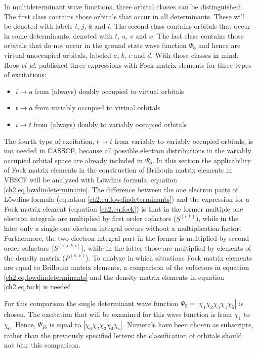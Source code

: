 In multideterminant wave functions, three orbital classes can be distinguished. The first class contains those orbitals that occur in all determinants. These will be denoted with labels $i$, $j$, $k$ and $l$. The second class contains orbitals that occur in some determinants, denoted with $t$, $u$, $v$ and $x$. The last class contains those orbitals that do not occur in the ground state wave function $\Psi_0$ and hence are virtual unoccupied orbitals, labeled $a$, $b$, $c$ and $d$. With those classes in mind, Roos \textit{et al.} published three expressions with Fock matrix elements for three types of excitations:
\begin{itemize}
\item{$i \rightarrow a$ from (always) doubly occupied to virtual orbitals}
\item{$t \rightarrow a$ from variably occupied to virtual orbitals}
\item{$i \rightarrow t$ from (always) doubly to variably occupied orbitals}
\end{itemize}
The fourth type of excitation, $t \rightarrow t$ from variably to variably occupied orbitals, is not needed in CASSCF, because all possible electron distributions in the variably occupied orbital space are already included in $\Psi_0$. In this section the applicability of Fock matrix elements in the construction of Brillouin matrix elements in VBSCF will be analyzed with L\"{o}wdins formula, equation \ref{ch2.eq.lowdindeterminants}. The difference between the one electron parts of L\"{o}wdins formula (equation \ref{ch2.eq.lowdindeterminants}) and the expression for a Fock matrix element (equation \ref{ch2.eq.fock}) is that in the former multiple one electron integrals are multiplied by first order cofactors ($S^{(i,k)}$), while in the later only a single one electron integral occurs without a multiplication factor. Furthermore, the two electron integral part in the former is multiplied by second order cofactors ($S^{(i,j,k,l)}$), while in the latter those are multiplied by elements of the density matrix ($P^{(\sigma,\nu)}$). To analyze in which situations Fock matrix elements are equal to Brillouin matrix elements, a comparison of the cofactors in equation \ref{ch2.eq.lowdindeterminants} and the density matrix elements in equation \ref{ch2.eq.fock} is needed.

For this comparison the single determinant wave function $\Psi_0 = |\chi_1\chi_2\chi_3\chi_4\chi_5|$ is chosen. The excitation that will be examined for this wave function is from $\chi_1$ to $\chi_6$. Hence, $\Psi_{16}$ is equal to $|\chi_6\chi_2\chi_3\chi_4\chi_5|$. Numerals have been chosen as subscripts, rather than the previously specified letters: the classification of orbitals should not blur this comparison. 

